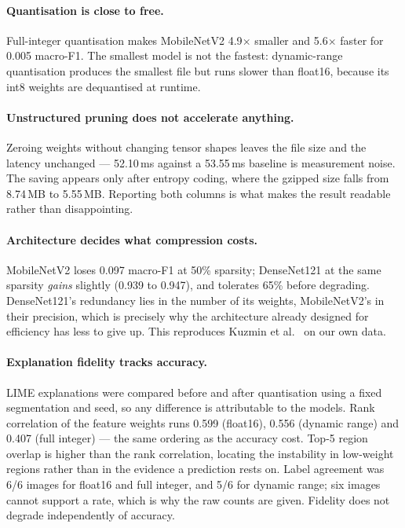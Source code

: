 \documentclass[sigconf,nonacm]{acmart}
\begin{document}
\paragraph{Quantisation is close to free.} Full-integer quantisation makes
MobileNetV2 4.9$\times$ smaller and 5.6$\times$ faster for 0.005 macro-F1. The
smallest model is not the fastest: dynamic-range quantisation produces the
smallest file but runs slower than float16, because its int8 weights are
dequantised at runtime.

\paragraph{Unstructured pruning does not accelerate anything.} Zeroing weights
without changing tensor shapes leaves the file size and the latency unchanged
--- 52.10\,ms against a 53.55\,ms baseline is measurement noise. The saving
appears only after entropy coding, where the gzipped size falls from 8.74\,MB to
5.55\,MB. Reporting both columns is what makes the result readable rather than
disappointing.

\paragraph{Architecture decides what compression costs.} MobileNetV2 loses
0.097 macro-F1 at 50\% sparsity; DenseNet121 at the same sparsity \emph{gains}
slightly (0.939 to 0.947), and tolerates 65\% before degrading. DenseNet121's
redundancy lies in the number of its weights, MobileNetV2's in their precision,
which is precisely why the architecture already designed for efficiency has less
to give up. This reproduces Kuzmin et al.~\cite{kuzmin2023} on our own data.

\paragraph{Explanation fidelity tracks accuracy.} LIME explanations were compared
before and after quantisation using a fixed segmentation and seed, so any
difference is attributable to the models. Rank correlation of the feature weights
runs 0.599 (float16), 0.556 (dynamic range) and 0.407 (full integer) --- the
same ordering as the accuracy cost. Top-5 region overlap is higher than the rank
correlation, locating the instability in low-weight regions rather than in the
evidence a prediction rests on. Label agreement was 6/6 images for float16 and
full integer, and 5/6 for dynamic range; six images cannot support a rate, which
is why the raw counts are given. Fidelity does not degrade independently of
accuracy.
\end{document}
